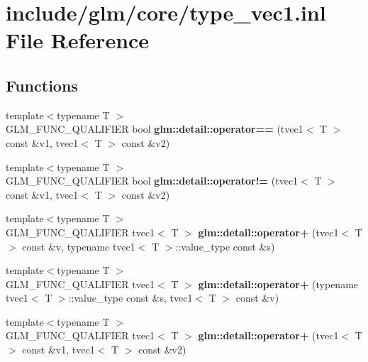 \hypertarget{type__vec1_8inl}{\section{include/glm/core/type\-\_\-vec1.inl \-File \-Reference}
\label{type__vec1_8inl}
}
\subsection*{\-Functions}
\begin{DoxyCompactItemize}
\item 
\hypertarget{namespaceglm_1_1detail_a73b150423d0880aaccd2dabbc9008cdb}{{\footnotesize template$<$typename T $>$ }\\\-G\-L\-M\-\_\-\-F\-U\-N\-C\-\_\-\-Q\-U\-A\-L\-I\-F\-I\-E\-R bool {\bfseries glm\-::detail\-::operator==} (tvec1$<$ \-T $>$ const \&v1, tvec1$<$ \-T $>$ const \&v2)}\label{namespaceglm_1_1detail_a73b150423d0880aaccd2dabbc9008cdb}

\item 
\hypertarget{namespaceglm_1_1detail_a611e8f2c930d31e758eaa74fa15c3145}{{\footnotesize template$<$typename T $>$ }\\\-G\-L\-M\-\_\-\-F\-U\-N\-C\-\_\-\-Q\-U\-A\-L\-I\-F\-I\-E\-R bool {\bfseries glm\-::detail\-::operator!=} (tvec1$<$ \-T $>$ const \&v1, tvec1$<$ \-T $>$ const \&v2)}\label{namespaceglm_1_1detail_a611e8f2c930d31e758eaa74fa15c3145}

\item 
\hypertarget{namespaceglm_1_1detail_a2580bdc3b66eee924d83e01e904b1149}{{\footnotesize template$<$typename T $>$ }\\\-G\-L\-M\-\_\-\-F\-U\-N\-C\-\_\-\-Q\-U\-A\-L\-I\-F\-I\-E\-R tvec1$<$ \-T $>$ {\bfseries glm\-::detail\-::operator+} (tvec1$<$ \-T $>$ const \&v, typename tvec1$<$ \-T $>$\-::value\-\_\-type const \&s)}\label{namespaceglm_1_1detail_a2580bdc3b66eee924d83e01e904b1149}

\item 
\hypertarget{namespaceglm_1_1detail_ad221a83a6f3d41d77f8650043f1ba5ef}{{\footnotesize template$<$typename T $>$ }\\\-G\-L\-M\-\_\-\-F\-U\-N\-C\-\_\-\-Q\-U\-A\-L\-I\-F\-I\-E\-R tvec1$<$ \-T $>$ {\bfseries glm\-::detail\-::operator+} (typename tvec1$<$ \-T $>$\-::value\-\_\-type const \&s, tvec1$<$ \-T $>$ const \&v)}\label{namespaceglm_1_1detail_ad221a83a6f3d41d77f8650043f1ba5ef}

\item 
\hypertarget{namespaceglm_1_1detail_a6145953121c50379992aba18340c58d3}{{\footnotesize template$<$typename T $>$ }\\\-G\-L\-M\-\_\-\-F\-U\-N\-C\-\_\-\-Q\-U\-A\-L\-I\-F\-I\-E\-R tvec1$<$ \-T $>$ {\bfseries glm\-::detail\-::operator+} (tvec1$<$ \-T $>$ const \&v1, tvec1$<$ \-T $>$ const \&v2)}\label{namespaceglm_1_1detail_a6145953121c50379992aba18340c58d3}


\end{DoxyCompactItemize}
